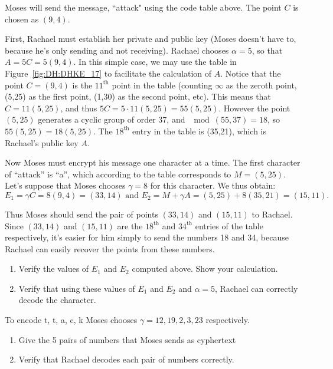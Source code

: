 \begin{example}{26} Moses will send the message, ``attack" using the code table above. The point $C$ is chosen as $(9,4)$. 

First, Rachael must establish her private and public key (Moses doesn't have to, because he's only sending and not receiving). Rachael chooses $\alpha= 5$, so that $A = 5C = 5(9,4)$. In this simple case, we  may use  the table in Figure~\ref{fig:DH:DHKE_17} to facilitate the calculation of $A$.  Notice that the point $C=(9,4)$ is the $11^{\textrm{th}}$ point in the table (counting $\infty$ as the zeroth point, (5,25) as the first point, (1,30) as the second point, etc). This means that $C = 11(5,25)$, and thus $5C = 5\cdot11(5,25) = 55(5,25)$.  However the point $(5,25)$ generates a cyclic group of order 37, and $\mod(55,37)=18$, so $55(5,25)=18(5,25)$.  The $18^{\textrm{th}}$ entry in the table is (35,21), which is Rachael's public key $A$.

Now Moses must encrypt his message one character at a time. The first character of ``attack'' is ``a'', which according to the table corresponds to $M=(5,25)$.  Let's suppose that Moses chooses $\gamma = 8$ for this character. We thus obtain:
\[
E_1=\gamma C = 8(9,4)=(33,14)  \text{   and   } 
E_2 = M +  \gamma A=(5,25) + 8(35,21) = (15,11). 
\]

Thus Moses should send the pair of points $(33,14)$ and $(15,11)$ to Rachael. Since $(33,14)$ and $(15,11)$ are the $18^{\textrm{th}}$ and $34^{\textrm{th}}$ entries of the table respectively, it's easier for him simply to send the numbers 18 and 34, because Rachael can easily recover the points from these numbers.

\begin{exercise}{}
\begin{enumerate}[a]
\item
Verify the values of $E_1$ and $E_2$ computed above. Show your calculation.
\item
Verify that using these values of $E_1$ and $E_2$ and $\alpha=5$, Rachael can correctly decode the character.
\end{enumerate}
\end{exercise}

\begin{exercise}{}
To encode t, t, a, c, k Moses chooses $\gamma = 12,19,2,3,23$ respectively. 
\begin{enumerate}[a]
\item Give the 5 pairs of numbers that Moses sends as cyphertext
\item Verify that Rachael decodes each pair of numbers correctly.
\end{enumerate}
\end{exercise}

\end{example}

